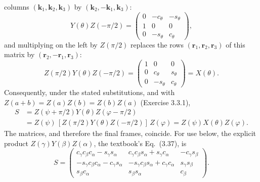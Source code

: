 columns $(\mathbf k_1,\mathbf k_2,\mathbf k_3)$ by
$(\mathbf k_2,-\mathbf k_1,\mathbf k_3)$:
\[
Y(\theta)Z(-\pi/2)
=\begin{pmatrix}0&-c_\theta&-s_\theta\\1&0&0\\0&-s_\theta&c_\theta
\end{pmatrix},
\]
and multiplying on the left by $Z(\pi/2)$ replaces the rows
$(\mathbf r_1,\mathbf r_2,\mathbf r_3)$ of this matrix by
$(\mathbf r_2,-\mathbf r_1,\mathbf r_3)$:
\[
Z(\pi/2)Y(\theta)Z(-\pi/2)
=\begin{pmatrix}1&0&0\\0&c_\theta&s_\theta\\0&-s_\theta&c_\theta\end{pmatrix}
=X(\theta).
\]
Consequently, under the stated substitutions, and with
$Z(a+b)=Z(a)Z(b)=Z(b)Z(a)$ (Exercise 3.3.1),
\[
\begin{aligned}
S&=Z(\psi+\pi/2)Y(\theta)Z(\varphi-\pi/2)\\
&=Z(\psi)\,[Z(\pi/2)Y(\theta)Z(-\pi/2)]\,Z(\varphi)
=Z(\psi)X(\theta)Z(\varphi).
\end{aligned}
\]
The matrices, and therefore the final frames, coincide.
For use below, the explicit product $Z(\gamma)Y(\beta)Z(\alpha)$, the
textbook's Eq.~(3.37), is
\begin{equation}\tag{3.37}\label{ch03:euler}
S=\begin{pmatrix}
c_\gamma c_\beta c_\alpha-s_\gamma s_\alpha&
c_\gamma c_\beta s_\alpha+s_\gamma c_\alpha&-c_\gamma s_\beta\\
-s_\gamma c_\beta c_\alpha-c_\gamma s_\alpha&
-s_\gamma c_\beta s_\alpha+c_\gamma c_\alpha&s_\gamma s_\beta\\
s_\beta c_\alpha&s_\beta s_\alpha&c_\beta
\end{pmatrix}.
\end{equation}

